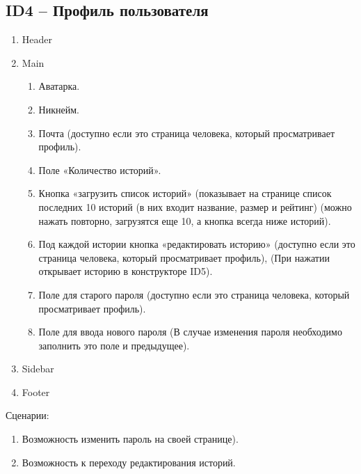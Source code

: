 \documentclass[a4paper]{article}
\begin{document}
		\subsection{ID4 – Профиль пользователя}
			\begin{enumerate}
				\item Header
				\item Main
				\begin{enumerate}
					\item Аватарка.
					\item Никнейм.
					\item Почта (доступно если это страница человека, который просматривает профиль).
					\item Поле «Количество историй».
					\item Кнопка «загрузить список историй» (показывает на странице список последних 10 историй (в них входит название, размер и рейтинг) (можно нажать повторно, загрузятся еще 10, а кнопка всегда ниже историй).
					\item Под каждой истории кнопка «редактировать историю» (доступно если это страница человека, который просматривает профиль), (При нажатии открывает историю в конструкторе ID5).
					\item Поле для старого пароля (доступно если это страница человека, который просматривает профиль).
					\item Поле для ввода нового пароля (В случае изменения пароля необходимо заполнить это поле и предыдущее).
				\end{enumerate}
				\item Sidebar
				\item Footer
			\end{enumerate}
			\large{Сценарии:}
				\begin{enumerate}
					\item Возможность изменить пароль на своей странице).
					\item Возможность к переходу редактирования историй.
				\end{enumerate}
		\newpage
\end{document}
